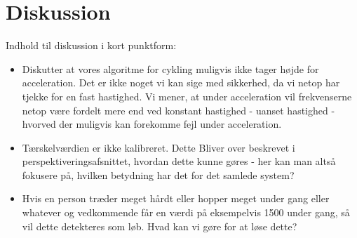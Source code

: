 \section{Diskussion}\label{sec:diskussion}

Indhold til diskussion i kort punktform:
\begin{itemize}
	\item Diskutter at vores algoritme for cykling muligvis ikke tager højde for acceleration. Det er ikke noget vi kan sige med sikkerhed, da vi netop har tjekke for en fast hastighed. Vi mener, at under acceleration vil frekvenserne netop være fordelt mere end ved konstant hastighed - uanset hastighed - hvorved der muligvis kan forekomme fejl under acceleration.
	\item Tærskelværdien er ikke kalibreret. Dette Bliver over beskrevet i perspektiveringsafsnittet, hvordan dette kunne gøres - her kan man altså fokusere på, hvilken betydning har det for det samlede system?
	\item Hvis en person træder meget hårdt eller hopper meget under gang eller whatever og vedkommende får en værdi på eksempelvis 1500 under gang, så vil dette detekteres som løb. Hvad kan vi gøre for at løse dette?
\end{itemize}
